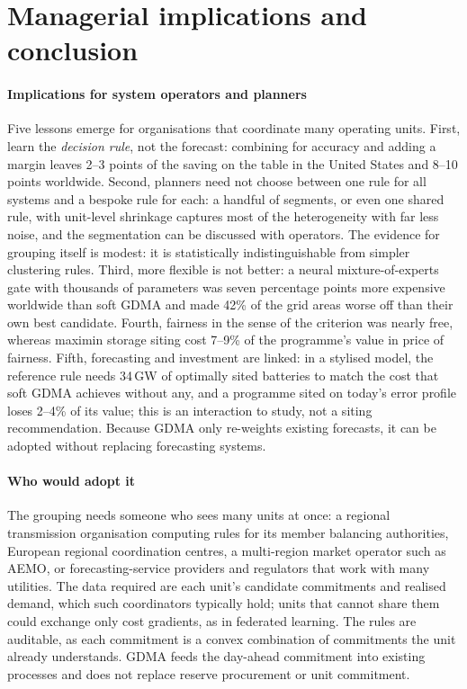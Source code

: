 \section{Managerial implications and conclusion}\label{sec:conclusion}

\paragraph{Implications for system operators and planners}
Five lessons emerge for organisations that coordinate many operating units.
First, learn the \emph{decision rule}, not the forecast: combining for accuracy and adding a margin leaves 2--3 points of the saving on the table in the United States and 8--10 points worldwide.
Second, planners need not choose between one rule for all systems and a bespoke rule for each: a handful of segments, or even one shared rule, with unit-level shrinkage captures most of the heterogeneity with far less noise, and the segmentation can be discussed with operators. The evidence for grouping itself is modest: it is statistically indistinguishable from simpler clustering rules.
Third, more flexible is not better: a neural mixture-of-experts gate with thousands of parameters was seven percentage points more expensive worldwide than soft GDMA and made 42\% of the grid areas worse off than their own best candidate.
Fourth, fairness in the sense of the criterion was nearly free, whereas maximin storage siting cost 7--9\% of the programme's value in price of fairness.
Fifth, forecasting and investment are linked: in a stylised model, the reference rule needs 34\,GW of optimally sited batteries to match the cost that soft GDMA achieves without any, and a programme sited on today's error profile loses 2--4\% of its value; this is an interaction to study, not a siting recommendation.
Because GDMA only re-weights existing forecasts, it can be adopted without replacing forecasting systems.

\paragraph{Who would adopt it}
The grouping needs someone who sees many units at once: a regional transmission organisation computing rules for its member balancing authorities, European regional coordination centres, a multi-region market operator such as AEMO, or forecasting-service providers and regulators that work with many utilities.
The data required are each unit's candidate commitments and realised demand, which such coordinators typically hold; units that cannot share them could exchange only cost gradients, as in federated learning.
The rules are auditable, as each commitment is a convex combination of commitments the unit already understands.
GDMA feeds the day-ahead commitment into existing processes and does not replace reserve procurement or unit commitment.

